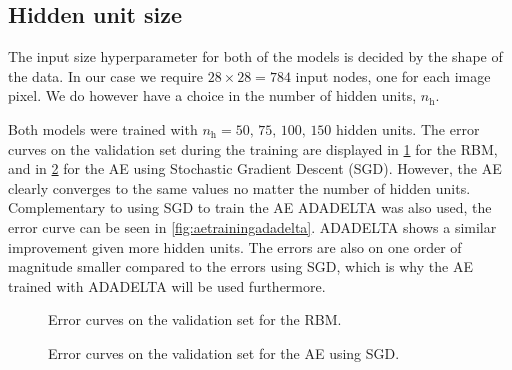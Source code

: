 \documentclass{article}
\begin{document}
\subsection{Hidden unit size}
The input size hyperparameter for both of the models is decided by the shape of the data.
In our case we require $28 \times 28 = 784$ input nodes, one for each image pixel.
We do however have a choice in the number of hidden units, $n_{\text{h}}$.

Both models were trained with $n_\text{h} = 50,\,75,\,100,\,150$ hidden units.
The error curves on the validation set during the training are displayed
in \cref{fig:rbmtraining} for the RBM,
and in \cref{fig:aetrainingsgd} for the AE using Stochastic Gradient Descent (SGD).
However, the AE clearly converges to the same values no matter the number of hidden units.
Complementary to using SGD to train the AE ADADELTA \cite{adadelta} was also used,
the error curve can be seen in \cref{fig:aetrainingadadelta}.
ADADELTA shows a similar improvement given more hidden units.
The errors are also on one order of magnitude smaller compared to the errors using SGD,
which is why the AE trained with ADADELTA will be used furthermore.

\begin{figure}[!ht]
  \centering
  \caption{Error curves on the validation set for the RBM.}
  \label{fig:rbmtraining}
\end{figure}


\begin{figure}[!ht]
  \centering
  \caption{Error curves on the validation set for the AE using SGD.}
  \label{fig:aetrainingsgd}
\end{figure}
\end{document}
